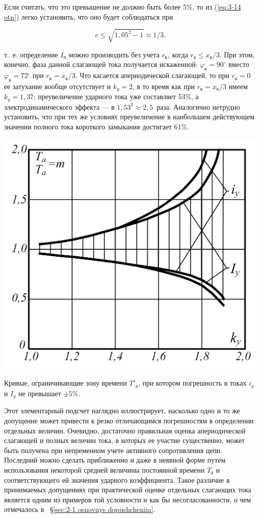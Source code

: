 Если считать, что это превышение не должно быть более 5\%, то из (\ref{eq:3-14 otn}) легко установить, что оно будет соблюдаться при

\begin{equation*}
	c \leq \sqrt{1,05^2 - 1} \approx 1/3,
\end{equation*}

т.~е. определение $ I_{\text{п}} $ можно производить без учета $ r_{\text{к}} $, когда $ r_{\text{к}} \leq x_{\text{к}} / 3 $. При этом, конечно, фаза данной слагающей тока получается искаженной: $ \varphi_{\text{к}} = 90^{\circ} $ вместо $ \varphi_{\text{к}} = 72^{\circ} $ при  $ r_{\text{к}} = x_{\text{к}} / 3 $. Что касается апериодической слагающей, то при $ r_{\text{к}} = 0 $ ее затухание вообще отсутствует и $ k_y = 2 $, в то время как при $ r_{\text{к}} = x_{\text{к}} / 3 $ имеем $ k_y = 1,37 $; преувеличение ударного тока уже составляет 53\%, а электродинамического эффекта --- в $ 1,53^2 \approx 2,5 $~раза. Аналогично нетрудно установить, что при тех же условиях преувеличение в наибольшем действующем значении полного тока короткого замыкания достигает 61\%.

\begin{floatingfigure}[rflt]{0.45\linewidth}
	\centering
	\includegraphics[width=0.40\linewidth]{pic/3-7}
	\caption{Кривые, ограничивающие зону времени $ T'_{\text{а}} $, при котором погрешность в токах $ i_y $ и $ I_y $ не превышает $ \pm5 \% $.}
	\label{ris:3-7 diagram}
\end{floatingfigure}

Этот элементарный подсчет наглядно иллюстрирует, насколько одно и то же допущение может привести к резко отличающимся погрешностям в определении отдельных величин. Очевидно, достаточно правильная оценка апериодической слагающей и полных величин тока, в которых ее участие существенно, может быть получена при непременном учете активного сопротивления цепи. Последний можно сделать приближенно и даже в неявной форме путем использования некоторой средней величины постоянной времени $ T_{\text{а}} $ и соответствующего ей значения ударного коэффициента. Такое различие в принимаемых допущениях при практической оценке отдельных слагающих тока является одним из примеров той условности и как бы несогласованности, о чем отмечалось в ~§\ref{sec:2-1 osnovnye dopushcheniia}.


